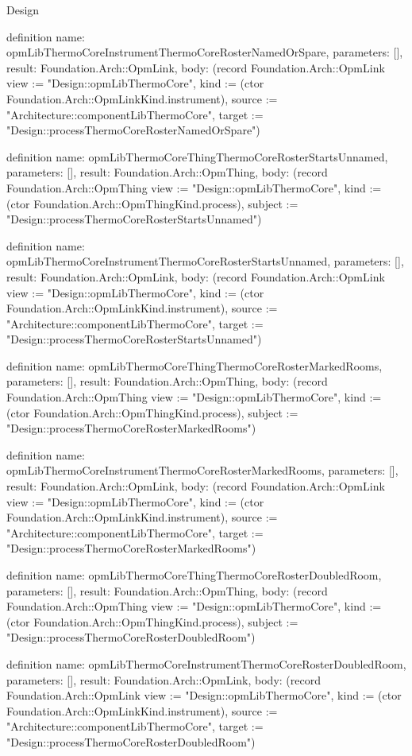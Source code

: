 \begin{lexlean}{Design}
\begin{semanticmodule}
definition{
  name: opmLibThermoCoreInstrumentThermoCoreRosterNamedOrSpare,
  parameters: [],
  result: Foundation.Arch::OpmLink,
  body: (record Foundation.Arch::OpmLink {view := "Design::opmLibThermoCore", kind := (ctor Foundation.Arch::OpmLinkKind.instrument), source := "Architecture::componentLibThermoCore", target := "Design::processThermoCoreRosterNamedOrSpare"})
}

definition{
  name: opmLibThermoCoreThingThermoCoreRosterStartsUnnamed,
  parameters: [],
  result: Foundation.Arch::OpmThing,
  body: (record Foundation.Arch::OpmThing {view := "Design::opmLibThermoCore", kind := (ctor Foundation.Arch::OpmThingKind.process), subject := "Design::processThermoCoreRosterStartsUnnamed"})
}

definition{
  name: opmLibThermoCoreInstrumentThermoCoreRosterStartsUnnamed,
  parameters: [],
  result: Foundation.Arch::OpmLink,
  body: (record Foundation.Arch::OpmLink {view := "Design::opmLibThermoCore", kind := (ctor Foundation.Arch::OpmLinkKind.instrument), source := "Architecture::componentLibThermoCore", target := "Design::processThermoCoreRosterStartsUnnamed"})
}

definition{
  name: opmLibThermoCoreThingThermoCoreRosterMarkedRooms,
  parameters: [],
  result: Foundation.Arch::OpmThing,
  body: (record Foundation.Arch::OpmThing {view := "Design::opmLibThermoCore", kind := (ctor Foundation.Arch::OpmThingKind.process), subject := "Design::processThermoCoreRosterMarkedRooms"})
}

definition{
  name: opmLibThermoCoreInstrumentThermoCoreRosterMarkedRooms,
  parameters: [],
  result: Foundation.Arch::OpmLink,
  body: (record Foundation.Arch::OpmLink {view := "Design::opmLibThermoCore", kind := (ctor Foundation.Arch::OpmLinkKind.instrument), source := "Architecture::componentLibThermoCore", target := "Design::processThermoCoreRosterMarkedRooms"})
}

definition{
  name: opmLibThermoCoreThingThermoCoreRosterDoubledRoom,
  parameters: [],
  result: Foundation.Arch::OpmThing,
  body: (record Foundation.Arch::OpmThing {view := "Design::opmLibThermoCore", kind := (ctor Foundation.Arch::OpmThingKind.process), subject := "Design::processThermoCoreRosterDoubledRoom"})
}

definition{
  name: opmLibThermoCoreInstrumentThermoCoreRosterDoubledRoom,
  parameters: [],
  result: Foundation.Arch::OpmLink,
  body: (record Foundation.Arch::OpmLink {view := "Design::opmLibThermoCore", kind := (ctor Foundation.Arch::OpmLinkKind.instrument), source := "Architecture::componentLibThermoCore", target := "Design::processThermoCoreRosterDoubledRoom"})
}


\end{semanticmodule}
\end{lexlean}
